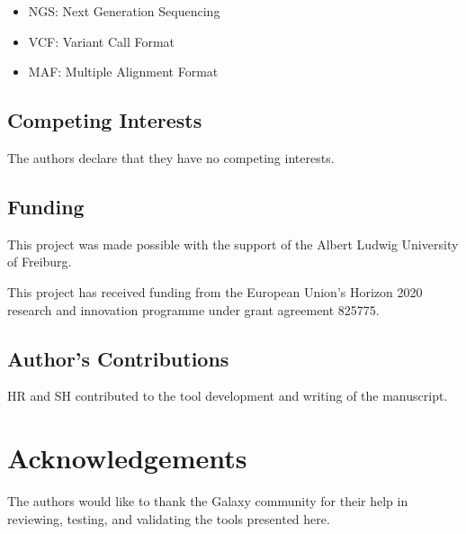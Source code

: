 \begin{itemize}
\item NGS: Next Generation Sequencing
\item VCF: Variant Call Format
\item MAF: Multiple Alignment Format
\end{itemize}

\subsection*{Competing Interests}
The authors declare that they have no competing interests.

\subsection*{Funding}
This project was made possible with the support of the Albert Ludwig University of Freiburg.

This project has received funding from the European Union’s Horizon 2020 research and innovation programme under grant agreement 825775.

\subsection*{Author's Contributions}

HR and SH contributed to the tool development and writing of the manuscript.

\section*{Acknowledgements}

The authors would like to thank the Galaxy community for their help in reviewing, testing, and validating the tools presented here.



